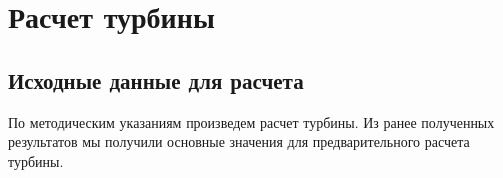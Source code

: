 
\newpage
\section{Расчет турбины}
\subsection{Исходные данные для расчета}

По методическим указаниям \cite{TURB} произведем расчет турбины. Из ранее полученных результатов мы получили основные значения для предварительного расчета турбины.

